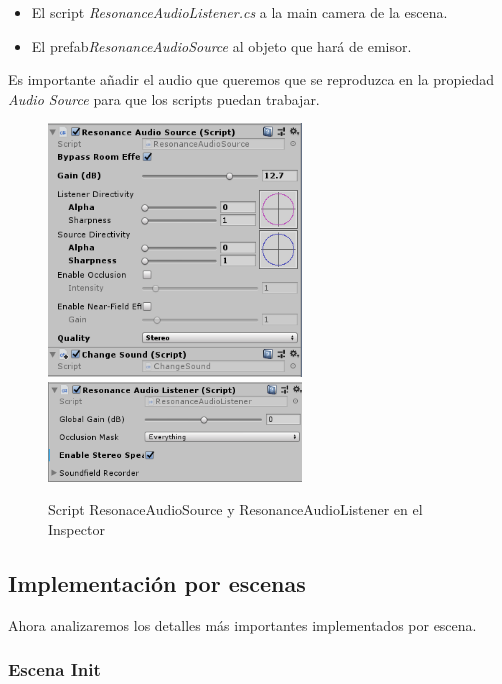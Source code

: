 \begin{itemize}
	\item El script \textit{ResonanceAudioListener.cs} a la main camera de la escena.
	\item El prefab\textit{ResonanceAudioSource} al objeto que hará de emisor.
\end{itemize}

\quad Es importante añadir el audio que queremos que se reproduzca en la propiedad \textit{Audio Source} para que los scripts puedan trabajar.

\begin{figure}[htb]
	\centering
	\includegraphics[width=0.6\textwidth]{./imagenes/audiosource}
	\includegraphics[width=0.6\textwidth]{./imagenes/audiolistener}
	\caption{Script ResonaceAudioSource y ResonanceAudioListener en el Inspector}
\end{figure}
\FloatBarrier

\subsection{Implementación por escenas}

\quad Ahora analizaremos los detalles más importantes implementados por escena.\\
	\subsubsection{Escena Init}

